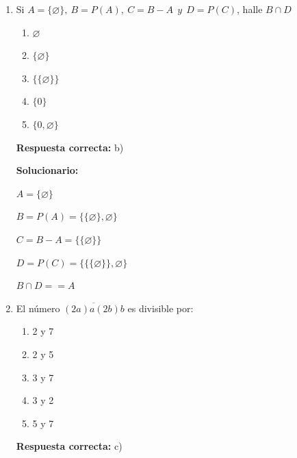 \begin{enumerate}
	\[
	T
	\left\{
	\begin{array}{c}
		\dfrac{A}{n+1}=\dfrac{B}{n}=\dfrac{C}{n-1}\\
	\end{array}
	\right.
	\]
	
	donde:
	
	$C=44\% (A+B)$
	
	$\dfrac{A+B}{n+1+n}=\dfrac{44\%(A+B)}{n-1}\Rightarrow n=12$
	
	También:
	
	$C=A-200$
	
	$\dfrac{A}{13}=\dfrac{C}{11}=\dfrac{A-C}{13-11}=\dfrac{200}{2}=100$
	
	Luego:
	
	$A=1,300;\qquad C=1,100\Rightarrow B=1,200$
	
	$T=1,300+1,200+1,100=$
	\vspace{6mm}
	
	\item Si $A=\{\varnothing\},\ B=P(A),\ C=B-A\ \ y\ \ D=P(C)$, halle $B\cap D$
	\begin{enumerate}[label=\alph*)]
		\item $\varnothing$
		\item $\{\varnothing\}$
		\item $\{\{\varnothing\}\}$
		\item $\{0\}$
		\item $\{0,\varnothing\}$
	\end{enumerate}
	\textbf{Respuesta correcta:} b)
	
	\vspace{2mm}
	\textbf{Solucionario:}
	
	$A=\{\varnothing\}$
	
	$B=P(A)=\{\{\varnothing\},\varnothing\}$
	
	$C=B-A=\{\{\varnothing\}\}$
	
	$D=P(C)=\{\{\{\varnothing\}\},\varnothing\}$
	
	$B\cap D=$\fbox{$\{\varnothing\}$}$=A$
	
	\vspace{6mm}
	
	\item El número $\overline{(2a)a(2b)b}$ es divisible por:
	\begin{enumerate}[label=\alph*)]
		\item 2 y 7
		\item 2 y 5
		\item 3 y 7
		\item 3 y 2
		\item 5 y 7
	\end{enumerate}
	\textbf{Respuesta correcta:} c)
	

\end{enumerate}
